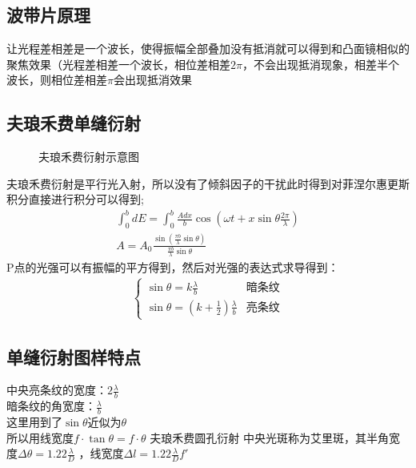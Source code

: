 \documentclass[UFT8]{article}
\begin{document}
\subsection{波带片原理}
让光程差相差是一个波长，使得振幅全部叠加没有抵消就可以得到和凸面镜相似的聚焦效果（光程差相差一个波长，相位差相差$2\pi$，不会出现抵消现象，相差半个波长，则相位差相差$\pi $会出现抵消效果
\subsection{夫琅禾费单缝衍射}
\begin{figure}[htbp]
\begin{center}
\end{center}
\caption{夫琅禾费衍射示意图}
\end{figure}
夫琅禾费衍射是平行光入射，所以没有了倾斜因子的干扰此时得到对菲涅尔惠更斯积分直接进行积分可以得到;
\begin{gather*}
\int_{0}^{b}dE=\int_{0}^{b}\frac{A dx}{b}\cos (\omega t+x\sin \theta \frac{2\pi }{\lambda})\\
A=A_0\frac{\sin (\frac{\pi b}{\lambda}\sin \theta)}{\frac{\pi b}{\lambda}\sin \theta}
\end{gather*}
P点的光强可以有振幅的平方得到，然后对光强的表达式求导得到：
\begin{align*}
\begin{cases}
\sin\theta=k\frac{\lambda}{b}&\text{暗条纹}\\
\sin \theta=(k+\frac{1}{2})\frac{\lambda}{b}&\text{亮条纹}
\end{cases}
\end{align*}
\subsection{单缝衍射图样特点}
中央亮条纹的宽度：$2\frac{\lambda}{b}$\\
暗条纹的角宽度：$\frac{\lambda}{b}$\\
这里用到了$\sin \theta$近似为$\theta$\\
所以用线宽度$f\cdot \tan  \theta=f\cdot \theta$
夫琅禾费圆孔衍射
中央光斑称为艾里斑，其半角宽度$\Delta\theta=1.22\frac{\lambda}{D}$
，线宽度$\Delta l=1.22\frac{\lambda}{D}f'$
\end{document}
